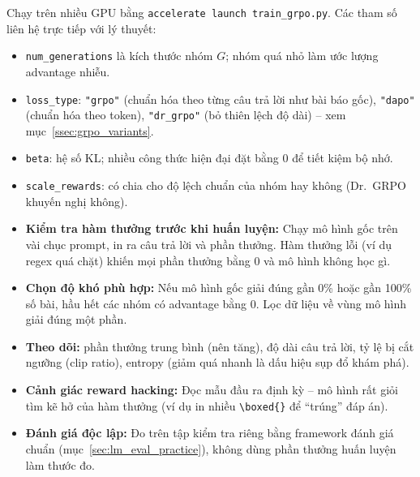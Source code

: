 Chạy trên nhiều GPU bằng \texttt{accelerate launch train\_grpo.py}. Các tham số liên hệ trực tiếp với lý thuyết:
\begin{itemize}
	\item \texttt{num\_generations} là kích thước nhóm $G$; nhóm quá nhỏ làm ước lượng advantage nhiễu.
	\item \texttt{loss\_type}: \texttt{"grpo"} (chuẩn hóa theo từng câu trả lời như bài báo gốc), \texttt{"dapo"} (chuẩn hóa theo token), \texttt{"dr\_grpo"} (bỏ thiên lệch độ dài) -- xem mục~\ref{ssec:grpo_variants}.
	\item \texttt{beta}: hệ số KL; nhiều công thức hiện đại đặt bằng 0 để tiết kiệm bộ nhớ.
	\item \texttt{scale\_rewards}: có chia cho độ lệch chuẩn của nhóm hay không (Dr.~GRPO khuyến nghị không).
\end{itemize}

\begin{tcolorbox}[title={Kinh nghiệm thực chiến khi chạy GRPO}, colback=red!5!white, colframe=red!75!black, fonttitle=\bfseries]
\begin{itemize}
	\item \textbf{Kiểm tra hàm thưởng trước khi huấn luyện:} Chạy mô hình gốc trên vài chục prompt, in ra câu trả lời và phần thưởng. Hàm thưởng lỗi (ví dụ regex quá chặt) khiến mọi phần thưởng bằng 0 và mô hình không học gì.
	\item \textbf{Chọn độ khó phù hợp:} Nếu mô hình gốc giải đúng gần 0\% hoặc gần 100\% số bài, hầu hết các nhóm có advantage bằng 0. Lọc dữ liệu về vùng mô hình giải đúng một phần.
	\item \textbf{Theo dõi:} phần thưởng trung bình (nên tăng), độ dài câu trả lời, tỷ lệ bị cắt ngưỡng (clip ratio), entropy (giảm quá nhanh là dấu hiệu sụp đổ khám phá).
	\item \textbf{Cảnh giác reward hacking:} Đọc mẫu đầu ra định kỳ -- mô hình rất giỏi tìm kẽ hở của hàm thưởng (ví dụ in nhiều \texttt{\textbackslash boxed\{\}} để “trúng” đáp án).
	\item \textbf{Đánh giá độc lập:} Đo trên tập kiểm tra riêng bằng framework đánh giá chuẩn (mục~\ref{sec:lm_eval_practice}), không dùng phần thưởng huấn luyện làm thước đo.
\end{itemize}
\end{tcolorbox}
